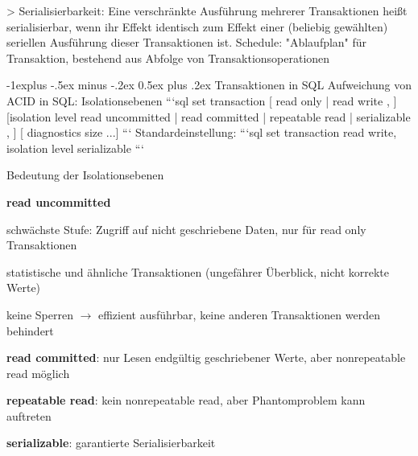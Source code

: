 \documentclass[a4paper]{article}
\makeatletter
\renewcommand{\subsection}{\@startsection{subsection}{2}{0mm}%
                                {-1explus -.5ex minus -.2ex}%
                                {0.5ex plus .2ex}%
                                {\normalfont\normalsize\bfseries}}
\makeatother
\begin{document}
\begin{multicols}{3}
\begin{itemize*}
    > Serialisierbarkeit: Eine verschränkte Ausführung mehrerer Transaktionen heißt serialisierbar, wenn ihr Effekt identisch zum Effekt einer (beliebig gewählten) seriellen Ausführung dieser Transaktionen ist.
    Schedule: "Ablaufplan" für Transaktion, bestehend aus Abfolge von Transaktionsoperationen

    \subsection{Transaktionen in SQL}
    Aufweichung von ACID in SQL: Isolationsebenen
    ```sql
    set transaction
        [ { read only | read write }, ]
        [isolation level
                { read uncommitted |
                    read committed |
                    repeatable read |
                    serializable }, ]
        [ diagnostics size ...]
    ```
    Standardeinstellung:
    ```sql
    set transaction read write,
    isolation level serializable
    ```

    Bedeutung der Isolationsebenen
    \begin{itemize*}
        \item \textbf{read uncommitted}
        \begin{itemize*}
            \item schwächste Stufe: Zugriff auf nicht geschriebene Daten, nur für read only Transaktionen
            \item statistische und ähnliche Transaktionen (ungefährer Überblick, nicht korrekte Werte)
            \item keine Sperren $\rightarrow$ effizient ausführbar, keine anderen Transaktionen werden behindert
        \end{itemize*}
        \item \textbf{read committed}: nur Lesen endgültig geschriebener Werte, aber nonrepeatable read möglich
        \item \textbf{repeatable read}: kein nonrepeatable read, aber Phantomproblem kann auftreten
        \item \textbf{serializable}: garantierte Serialisierbarkeit
    \end{itemize*}



\end{itemize*}
\end{multicols}
\end{document}
